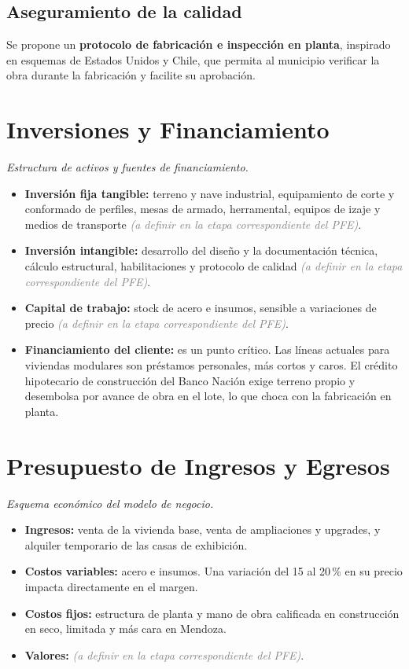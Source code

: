 \documentclass[11pt,a4paper]{article}
\newcommand{\pend}{\textcolor{gray}{\textit{(a definir en la etapa correspondiente del PFE)}}}
\begin{document}
\subsection{Aseguramiento de la calidad}
Se propone un \textbf{protocolo de fabricación e inspección en planta}, inspirado en esquemas de Estados Unidos y Chile, que permita al municipio verificar la obra durante la fabricación y facilite su aprobación.

\section{Inversiones y Financiamiento}
\textit{Estructura de activos y fuentes de financiamiento.}

\begin{itemize}
  \item \textbf{Inversión fija tangible:} terreno y nave industrial, equipamiento de corte y conformado de perfiles, mesas de armado, herramental, equipos de izaje y medios de transporte \pend.
  \item \textbf{Inversión intangible:} desarrollo del diseño y la documentación técnica, cálculo estructural, habilitaciones y protocolo de calidad \pend.
  \item \textbf{Capital de trabajo:} stock de acero e insumos, sensible a variaciones de precio \pend.
  \item \textbf{Financiamiento del cliente:} es un punto crítico. Las líneas actuales para viviendas modulares son préstamos personales, más cortos y caros. El crédito hipotecario de construcción del Banco Nación exige terreno propio y desembolsa por avance de obra en el lote, lo que choca con la fabricación en planta.
\end{itemize}

\section{Presupuesto de Ingresos y Egresos}
\textit{Esquema económico del modelo de negocio.}

\begin{itemize}
  \item \textbf{Ingresos:} venta de la vivienda base, venta de ampliaciones y upgrades, y alquiler temporario de las casas de exhibición.
  \item \textbf{Costos variables:} acero e insumos. Una variación del 15 al 20\,\% en su precio impacta directamente en el margen.
  \item \textbf{Costos fijos:} estructura de planta y mano de obra calificada en construcción en seco, limitada y más cara en Mendoza.
  \item \textbf{Valores:} \pend.
\end{itemize}
\end{document}
